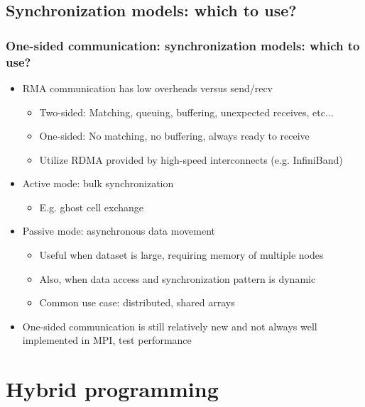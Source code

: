 \documentclass{beamer}
\begin{document}
\subsection{Synchronization models: which to use?}
\begin{frame}[fragile]
  \frametitle{One-sided communication: synchronization models: which to use?}
  \begin{itemize}
  \item RMA communication has low overheads versus send/recv
    \begin{itemize}
    \item Two-sided: Matching, queuing, buffering, unexpected receives, etc...
    \item One-sided: No matching, no buffering, always ready to receive
    \item Utilize RDMA provided by high-speed interconnects (e.g.
      InfiniBand)
    \end{itemize}
  \item  Active mode: bulk synchronization
    \begin{itemize}
    \item E.g. ghost cell exchange
    \end{itemize}
  \item Passive mode: asynchronous data movement
    \begin{itemize}
    \item Useful when dataset is large, requiring memory of multiple
      nodes
    \item Also, when data access and synchronization pattern is dynamic
    \item Common use case: distributed, shared arrays
    \end{itemize}
  \item One-sided communication is still relatively new and not always well implemented in MPI, test performance
  \end{itemize}
\end{frame}

\section{Hybrid programming}
\end{document}
